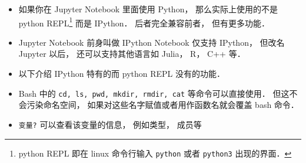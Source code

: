 
\begin{issues}
\issueDraft
\end{issues}

\begin{itemize}
\item 如果你在 Jupyter Notebook 里面使用 Python， 那么实际上使用的不是 python REPL\footnote{python REPL 即在 linux 命令行输入 \verb|python| 或者 \verb|python3| 出现的界面．} 而是 IPython． 后者完全兼容前者， 但有更多功能．
\item Jupyter Notebook 前身叫做 IPython Notebook 仅支持 IPython， 但改名 Jupyter 以后， 还可以支持其他语言如 Julia， R， C++ 等．
\item 以下介绍 IPython 特有的而 python REPL 没有的功能．
\item Bash 中的 \verb|cd, ls, pwd, mkdir, rmdir, cat| 等命令可以直接使用． 但这不会污染命名空间， 如果对这些名字赋值或者用作函数名就会覆盖 bash 命令．
\item \verb|变量?| 可以查看该变量的信息， 例如类型， 成员等
\end{itemize}
